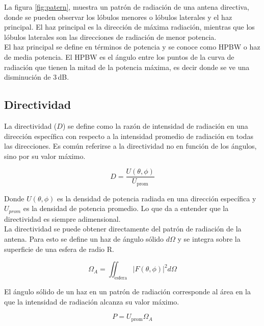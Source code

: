La figura \ref{fig:patern}, muestra un patrón de radiación de una antena directiva, donde se pueden observar los lóbulos menores o lóbulos laterales y el haz principal. El haz principal es la dirección de máxima radiación, mientras que los lóbulos laterales son las direcciones de radiación de menor potencia.\\

El haz principal se define en términos de potencia y se conoce como HPBW o haz de media potencia. El HPBW es el ángulo entre los puntos de la curva de radiación que tienen la mitad de la potencia máxima, es decir donde se ve una disminución de 3 dB.\\

\subsection{Directividad}

La directividad ($D$) se define como la razón de intensidad de radiación en una dirección específica con respecto a la intensidad promedio de radiación en todas las direcciones. Es común referirse a la directividad no en función de los ángulos, sino por su valor máximo.

\begin{equation}\label{eq:directivity}
    D = \frac{U(\theta, \phi)}{U_{\text{prom}}}
\end{equation}

Donde $U(\theta, \phi)$ es la densidad de potencia radiada en una dirección específica y $U_{prom}$ es la densidad de potencia promedio. Lo que da a entender que la directividad es siempre adimensional.\\

La directividad se puede obtener directamente del patrón de radiación de la antena. Para esto se define un haz de ángulo sólido $d\Omega$ y se integra sobre la superficie de una esfera de radio R.

\begin{equation}\label{eq:solidangle}
    \Omega_{A} = \iint_{\text{esfera}} |F(\theta, \phi)|^{2} d\Omega
\end{equation}

El ángulo sólido de un haz en un patrón de radiación corresponde al área en la que la intensidad de radiación alcanza su valor máximo.

\begin{equation}\label{eq:powerdensity}
    P = U_{\text{prom}} \Omega_{A}
\end{equation}

